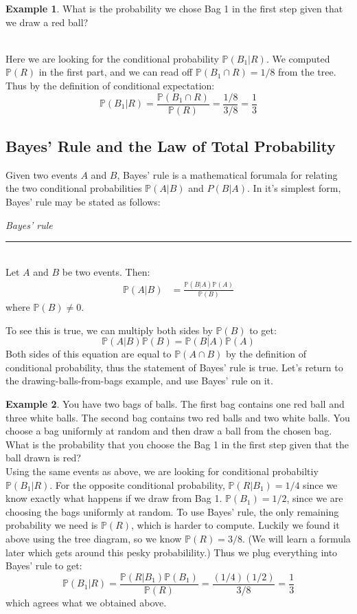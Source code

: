 \documentclass[12pt]{article}
\theoremstyle{definition}
\newtheorem*{example}{Example}
\theoremstyle{remark}
\def\P{{\mathbb P}}
\begin{document}
\begin{example}
\item What is the probability we chose Bag 1 in the first step given that we draw a red ball?\\\

Here we are looking for the conditional probability $\P(B_1|R)$. We computed $\P(R)$ in the first part, and we can read off $\P(B_1 \cap R) = 1/8$ from the tree. Thus by the definition of conditional expectation:
\[
\P(B_1|R) = \frac{\P(B_1 \cap R)}{\P(R)} = \frac{1/8}{3/8} = \frac{1}{3}
\]

\end{example}

\subsection{Bayes' Rule and the Law of Total Probability}
Given two events $A$ and $B$, Bayes' rule is a mathematical forumala for relating the two conditional probabilities $\P(A|B)$ and $P(B|A)$. In it's simplest form, Bayes' rule may be stated as follows:

\begin{framed}
\emph{Bayes' rule}\\
  \rule{\dimexpr{}\fboxrule}{.1pt} \\
Let $A$ and $B$ be two events. Then:
\begin{align*}
\P(A | B) &= \frac{ \P(B|A)\P(A)}{\P(B)}
\end{align*}
where $\P(B) \neq 0.$
\end{framed}
To see this is true, we can multiply both sides by $\P(B)$ to get:
\[
\P(A|B) \P(B) = \P(B|A)\P(A)
\]
Both sides of this equation are equal to $\P(A\cap B)$ by the definition of conditional probability, thus the statement of Bayes' rule is true. Let's return to the drawing-balls-from-bags example, and use Bayes' rule on it.

\begin{example}You have two bags of balls. The first bag contains one red ball and three white balls. The second bag contains two red balls and two white balls. You choose a bag uniformly at random and then draw a ball from the chosen bag. What is the probability that you choose the Bag 1 in the first step given that the ball drawn is red?\\

Using the same events as above, we are looking for conditional probabiltiy $\P(B_1|R)$. For the opposite conditional probability, $\P(R | B_1) = 1/4$ since we know exactly what happens if we draw from Bag 1. $\P(B_1) = 1/2$, since we are choosing the bags uniformly at random. To use Bayes' rule, the only remaining probability we need is $\P(R)$, which is harder to compute. Luckily we found it above using the tree diagram, so we know $\P(R) = 3/8$. (We will learn a formula later which gets around this pesky probabilility.) Thus we plug everything into Bayes' rule to get:
\[
\P(B_1| R) = \frac{ \P(R|B_1)\P(B_1)}{\P(R)} = \frac{ (1/4)(1/2) }{3/8} = \frac{1}{3}
\]
which agrees what we obtained above.
\end{example}
\end{document}
